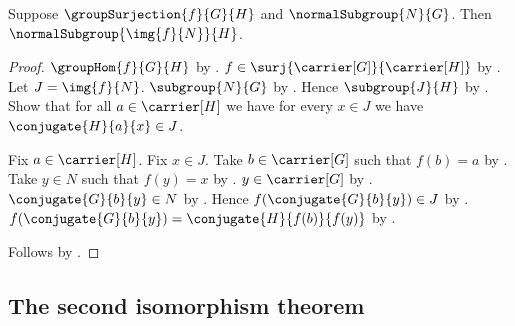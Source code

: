 \begin{corollary}\label{group_surjection_normal_image}
    Suppose $\groupSurjection{f}{G}{H}$ and
        $\normalSubgroup{N}{G}$.
    Then $\normalSubgroup{\img{f}{N}}{H}$.
\end{corollary}
\begin{proof}
    $\groupHom{f}{G}{H}$ by .
    $f\in\surj{\carrier[G]}{\carrier[H]}$ by
        .
    Let $J=\img{f}{N}$.
    $\subgroup{N}{G}$ by .
    Hence $\subgroup{J}{H}$ by
        .
    Show that for all $a\in\carrier[H]$ we have for every $x\in J$
        we have $\conjugate{H}{a}{x}\in J$.
    \begin{subproof}
        Fix $a\in\carrier[H]$.
        Fix $x\in J$.
        Take $b\in\carrier[G]$ such that $f(b)=a$ by
            .
        Take $y\in N$ such that $f(y)=x$ by
            .
        $y\in\carrier[G]$ by
            .
        $\conjugate{G}{b}{y}\in N$ by
            .
        Hence $f(\conjugate{G}{b}{y})\in J$ by
            .
        $f(\conjugate{G}{b}{y})=
            \conjugate{H}{f(b)}{f(y)}$ by
            .
    \end{subproof}
    Follows by .
\end{proof}

\subsection{The second isomorphism theorem}

